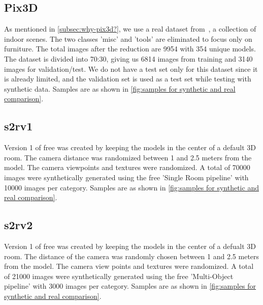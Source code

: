 \subsection{Pix3D}\label{subsec:pix3d}
As mentioned in \autoref{subsec:why-pix3d?}, we use a real dataset from~\cite{pix3d}, a collection of indoor scenes.
The two classes ’misc’ and ’tools’ are eliminated to focus only on furniture.
The total images after the reduction are 9954 with 354 unique models.
The dataset is divided into 70:30, giving us 6814 images from training and 3140 images for validation/test.
We do not have a test set only for this dataset since it is already limited, and the validation set is used as a test set while testing with synthetic data.
Samples are as shown in \autoref{fig:samples for synthetic and real comparison}.

\subsection{\gls{s2rv1}}\label{subsec:gls{free}-version-1}
Version 1 of \gls{free} was created by keeping the models in the center of a default 3D room.
The camera distance was randomized between 1 and 2.5 meters from the model.
The camera viewpoints and textures were randomized.
A total of 70000 images were synthetically generated using the \gls{free} 'Single Room pipeline' with 10000 images per category.
Samples are as shown in \autoref{fig:samples for synthetic and real comparison}.

\subsection{\gls{s2rv2}}\label{subsec:gls{free}-version-2}
Version 1 of \gls{free} was created by keeping the models in the center of a defualt 3D room.
The distance of the camera was randomly chosen between 1 and 2.5 meters from the model.
The camera view points and textures were randomized.
A total of 21000 images were synthetically generated using the \gls{free} 'Multi-Object pipeline' with 3000 images per category.
Samples are as shown in \autoref{fig:samples for synthetic and real comparison}.

